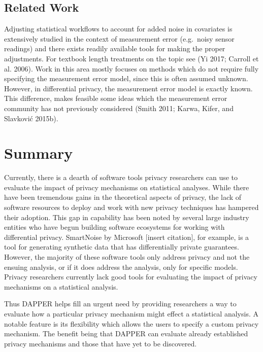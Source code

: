 \hypertarget{related-work}{%
\subsection{Related Work}\label{related-work}}

Adjusting statistical workflows to account for added noise in covariates
is extensively studied in the context of measurement error (e.g.~noisy sensor readings)
and there exists readily available tools for making the proper adjustments.
For textbook length treatments on the topic see (Yi 2017; Carroll et al. 2006).
Work in this area mostly focuses on methods which do not require fully specifying the
measurement error model, since this is often assumed unknown.
However, in differential privacy, the measurement error model is exactly known.
This difference, makes feasible some ideas which the measurement
error community has not previously considered (Smith 2011; Karwa, Kifer, and Slavković 2015b).

\hypertarget{summary}{%
\section{Summary}\label{summary}}

Currently, there is a dearth of software tools privacy researchers can use
to evaluate the impact of privacy mechanisms on statistical analyses.
While there have been tremendous gains in the theoretical aspects of privacy,
the lack of software resources to deploy and work with new privacy techniques has
hampered their adoption. This gap in capability has been noted by several
large industry entities who have begun building software ecosystems for
working with differential privacy. SmartNoise by Microsoft {[}insert citation{]}, for example,
is a tool for generating synthetic data that has differentially private guarantees.
However, the majority of these software tools only address privacy and not the
ensuing analysis, or if it does address the analysis, only for specific models.
Privacy researchers currently lack good tools for evaluating the impact
of privacy mechanisms on a statistical analysis.

Thus DAPPER helps fill an urgent need by providing researchers a way to evaluate
how a particular privacy mechanism might effect a statistical analysis. A notable
feature is its flexibility which allows the users to specify a custom
privacy mechanism. The benefit being that DAPPER can evaluate already
established privacy mechanisms and those that have yet to be discovered.

